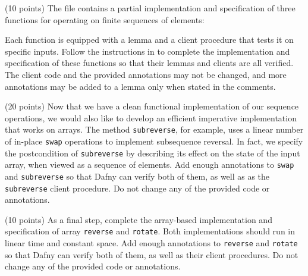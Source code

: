 \documentclass{handout}
\begin{document}
\begin{questions}

\item (10 points) \label{prob:dafny-first} The file  
contains a partial implementation and specification of three functions for
operating on finite sequences of elements:


Each function is equipped with a lemma and a client procedure that tests it on
specific inputs. Follow the instructions in   to complete
the implementation and specification of these functions so that their lemmas and
clients are all verified.  The client code and the provided annotations may not
be changed, and more annotations may be added to a lemma only when stated in the
comments.



\item (20 points) Now that we have a clean functional implementation of our
sequence operations, we would also like to develop an efficient imperative
implementation that works on arrays.  The method \lstinline{subreverse}, for
example, uses a linear number of in-place \lstinline{swap} operations to
implement subsequence reversal. In fact, we specify the postcondition of
\lstinline{subreverse} by describing its effect on the state of the input array,
when viewed as a sequence of elements. Add enough annotations to
\lstinline{swap} and \lstinline{subreverse} so that Dafny can verify both of
them, as well as as the \lstinline{subreverse} client procedure.  Do not change
any of the provided code or annotations.



\item (10 points)  \label{prob:dafny-last} As a final step, complete the
array-based implementation and specification of array \lstinline{reverse} and
\lstinline{rotate}. Both implementations should run in linear time and constant
space.  Add enough annotations to \lstinline{reverse} and \lstinline{rotate} so
that Dafny can verify both of them, as well as their client procedures.  Do not
change any of the provided code or annotations.



\end{questions}
\end{document}
